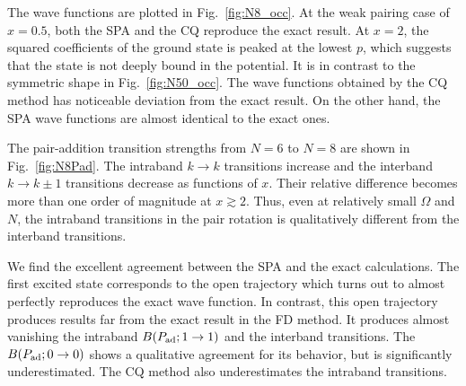 \documentclass[%
superscriptaddress,
preprint,
showpacs,
nofootinbib,
amsmath,amssymb,
prc,
floatfix ]%
{revtex4-1}
\begin{document}
The wave functions are plotted in Fig.~\ref{fig:N8_occ}. 
At the weak pairing case of $x=0.5$,
both the SPA and the CQ reproduce the exact result.
At $x=2$, the squared coefficients of the ground state is peaked at the
lowest $p$, which suggests that the state is not deeply bound in the
potential.
It is in contrast to the symmetric shape in Fig.~\ref{fig:N50_occ}.
The wave functions obtained by the CQ method has noticeable deviation
from the exact result.
On the other hand, the SPA wave functions are almost identical to the
exact ones.



The pair-addition transition strengths from $N=6$ to $N=8$ are
shown in Fig.~\ref{fig:N8Pad}.
The intraband $k\rightarrow k$ transitions increase and 
the interband $k\rightarrow k\pm1$ transitions decrease as
functions of $x$.
Their relative difference becomes
more than one order of magnitude at $x\gtrsim 2$.
Thus, even at relatively small $\Omega$ and $N$,
the intraband transitions in the pair rotation is qualitatively different
from the interband transitions.

We find the excellent agreement between the SPA and the exact calculations.
The first excited state corresponds to the open trajectory which
turns out to almost perfectly reproduces the exact wave function.
In contrast, this open trajectory produces results far from the exact
result in the FD method.
It produces almost vanishing the intraband
$B(P_{\rm ad}; 1\rightarrow 1)$ and the interband transitions.
The $B(P_{\rm ad}; 0\rightarrow 0)$ shows a qualitative agreement for
its behavior, but is significantly underestimated.
The CQ method also underestimates the intraband transitions.

\end{document}

